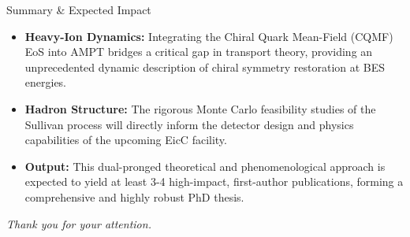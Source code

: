 \documentclass[aspectratio=169]{beamer}
\begin{document}
\begin{frame}{Summary \& Expected Impact}
    \begin{itemize}
        \item \textbf{Heavy-Ion Dynamics:} Integrating the Chiral Quark Mean-Field (CQMF) EoS into AMPT bridges a critical gap in transport theory, providing an unprecedented dynamic description of chiral symmetry restoration at BES energies.
        \item \textbf{Hadron Structure:} The rigorous Monte Carlo feasibility studies of the Sullivan process will directly inform the detector design and physics capabilities of the upcoming EicC facility.
        \item \textbf{Output:} This dual-pronged theoretical and phenomenological approach is expected to yield at least 3-4 high-impact, first-author publications, forming a comprehensive and highly robust PhD thesis.
    \end{itemize}
    \vspace{0.5cm}
    \begin{center}
        \textit{Thank you for your attention.}
    \end{center}
\end{frame}
\end{document}
